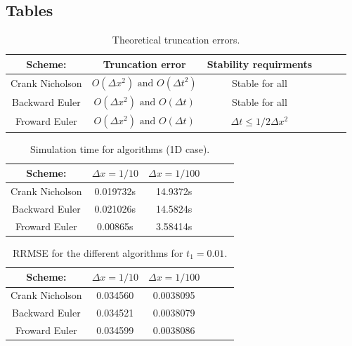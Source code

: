 \documentclass{article}
\begin{document}
\subsection{Tables}


\begin{table}[H]
\begin{center}
\caption{Theoretical truncation errors.}
\begin{tabular}{  |c|c|c|c|c|c| } \hline
Scheme:&	Truncation error&Stability requirments \\ \hline
Crank Nicholson&$O(\Delta x^2) \text{ and } O(\Delta t^2)$&Stable for all\\ \hline
Backward Euler&$O(\Delta x^2)  \text{ and } O(\Delta t)$&Stable for all\\ \hline
Froward Euler&$O(\Delta x^2)  \text{ and } O(\Delta t)$&$\Delta t \leq 1/2\Delta x^2$\\ \hline
\end{tabular}
\label{tab:a}
\end{center}
\end{table}

\begin{table}[H]
\begin{center}
\caption{Simulation time for algorithms (1D case).}
\begin{tabular}{  |c|c|c|c|c|c| } \hline
Scheme:&	$\Delta x = 1/10$&$\Delta x = 1/100$ \\ \hline
Crank Nicholson&0.019732s&14.9372s\\ \hline
Backward Euler&0.021026s&14.5824s\\ \hline
Froward Euler&	0.00865s&3.58414s\\ \hline
\end{tabular}
\label{tab:time}
\end{center}
\end{table}

\begin{table}[H]
\begin{center}
\caption{RRMSE for the different algorithms for $t_1=0.01$.}
\begin{tabular}{  |c|c|c|c|c|c| } \hline
Scheme:&	$\Delta x =1/10$&$\Delta x = 1/100$ \\ \hline
Crank Nicholson&0.034560&0.0038095\\ \hline
Backward Euler&0.034521&0.0038079\\ \hline
Froward Euler&0.034599&0.0038086\\ \hline
\end{tabular}
\label{tab:error}
\end{center}
\end{table}
\end{document}
